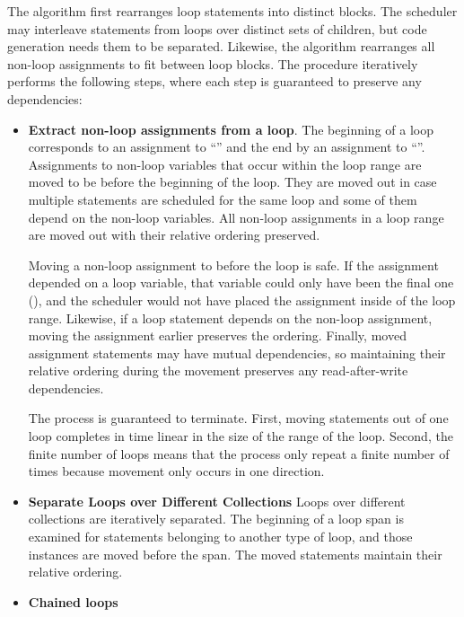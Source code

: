 The algorithm first rearranges loop statements into distinct blocks. The scheduler may interleave statements from loops over distinct sets of children, but code generation needs them to be separated.  Likewise, the algorithm rearranges all non-loop assignments to fit between loop blocks. The procedure iteratively performs the following steps, where each step is guaranteed to preserve any dependencies:
\begin{itemize}
\item \textbf{Extract non-loop assignments from a loop}. The beginning of a loop corresponds to an assignment to ``'' and the end by an assignment to ``''. Assignments to non-loop variables that occur within the loop range are moved to be before the beginning of the loop. They are moved out in case multiple statements are scheduled for the same loop and some of them depend on the non-loop variables. All non-loop assignments in a loop range are moved out with their relative ordering preserved.

Moving a non-loop assignment to before the loop is safe. If the assignment depended on a loop variable, that variable could only have been the final one (), and the scheduler would not have placed the assignment inside of the loop range. Likewise, if a loop statement depends on the non-loop assignment, moving the assignment earlier preserves the ordering. Finally, moved assignment statements may have mutual dependencies, so maintaining their relative ordering during the movement preserves any read-after-write dependencies.

The process is guaranteed to terminate. First, moving statements out of one loop completes in time linear in the size of the range of the loop. Second, the finite number of loops means that the process only repeat a finite number of times because movement only occurs in one direction.

\item \textbf{Separate Loops over Different Collections} Loops over different collections are iteratively separated. The beginning of a loop span is examined for statements belonging to another type of loop, and those instances are moved before the span. The moved statements maintain their relative ordering.




\item \textbf{Chained loops}
\end{itemize}




